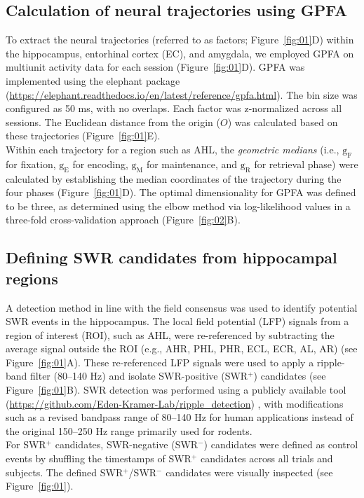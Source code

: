 \subsection{Calculation of neural trajectories using GPFA}
To extract the neural trajectories (referred to as factors; Figure~\ref{fig:01}D) within the hippocampus, entorhinal cortex (EC), and amygdala, we employed GPFA \cite{yu_gaussian-process_2009} on multiunit activity data for each session (Figure~\ref{fig:01}D). GPFA was implemented using the elephant package (\url{https://elephant.readthedocs.io/en/latest/reference/gpfa.html}). The bin size was configured as 50 ms, with no overlaps. Each factor was z-normalized across all sessions. The Euclidean distance from the origin ($O$) was calculated based on these trajectories (Figure~\ref{fig:01}E).
\\
\indent
Within each trajectory for a region such as AHL, the \textit{geometric medians} (i.e., $\mathrm{g_{F}}$ for fixation, $\mathrm{g_{E}}$ for encoding, $\mathrm{g_{M}}$ for maintenance, and $\mathrm{g_{R}}$ for retrieval phase) were calculated by establishing the median coordinates of the trajectory during the four phases (Figure~\ref{fig:01}D). The optimal dimensionality for GPFA was defined to be three, as determined using the elbow method via log-likelihood values in a three-fold cross-validation approach (Figure~\ref{fig:02}B).

\subsection{Defining SWR candidates from hippocampal regions}
A detection method in line with the field consensus \cite{liu_consensus_2022} was used to identify potential SWR events in the hippocampus. The local field potential (LFP) signals from a region of interest (ROI), such as AHL, were re-referenced by subtracting the average signal outside the ROI (e.g., AHR, PHL, PHR, ECL, ECR, AL, AR) (see Figure~\ref{fig:01}A). These re-referenced LFP signals were used to apply a ripple-band filter (80--140 Hz) and isolate SWR-positive (SWR$^+$) candidates (see Figure~\ref{fig:01}B). SWR detection was performed using a publicly available tool (\url{https://github.com/Eden-Kramer-Lab/ripple_detection}) \cite{kay_hippocampal_2016}, with modifications such as a revised bandpass range of 80--140 Hz for human applications \cite{norman_hippocampal_2019,norman_hippocampal_2021} instead of the original 150--250 Hz range primarily used for rodents.
\\
\indent
For SWR$^+$ candidates, SWR-negative (SWR$^-$) candidates were defined as control events by shuffling the timestamps of SWR$^+$ candidates across all trials and subjects. The defined SWR$^+$/SWR$^-$ candidates were visually inspected (see Figure~\ref{fig:01}).

